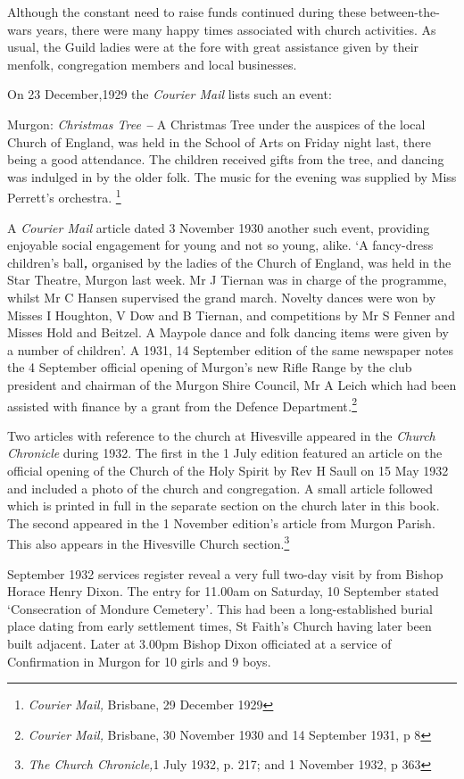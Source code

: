 Although the constant need to raise funds continued during these between-the-wars years, there were many happy times associated with church activities. As usual, the Guild ladies were at the fore with great assistance given by their menfolk, congregation members and local businesses.

On 23 December,1929 the \emph{Courier Mail} lists such an event:

Murgon: \emph{Christmas Tree \textbf{-- }}A Christmas Tree under the auspices of the local Church of England, was held in the School of Arts on Friday night last, there being a good attendance. The children received gifts from the tree, and dancing was indulged in by the older folk. The music for the evening was supplied by Miss Perrett's orchestra. \footnote{\emph{Courier Mail,} Brisbane, 29 December 1929}

A \emph{Courier Mail} article dated 3 November 1930 another such event, providing enjoyable social engagement for young and not so young, alike. `A fancy-dress children's ball\emph{\textbf{,}} organised by the ladies of the Church of England, was held in the Star Theatre, Murgon last week. Mr J Tiernan was in charge of the programme, whilst Mr C Hansen supervised the grand march. Novelty dances were won by Misses I Houghton, V Dow and B Tiernan, and competitions by Mr S Fenner and Misses Hold and Beitzel. A Maypole dance and folk dancing items were given by a number of children'. A 1931, 14 September edition of the same newspaper notes the 4 September official opening of Murgon's new Rifle Range by the club president and chairman of the Murgon Shire Council, Mr A Leich which had been assisted with finance by a grant from the Defence Department\emph{.}\footnote{\emph{Courier Mail,} Brisbane, 30 November 1930 and 14 September 1931, p 8}

Two articles with reference to the church at Hivesville appeared in the \emph{Church Chronicle} during 1932. The first in the 1 July edition featured an article on the official opening of the Church of the Holy Spirit by Rev H Saull on 15 May 1932 and included a photo of the church and congregation. A small article followed which is printed in full in the separate section on the church later in this book. The second appeared in the 1 November edition's article from Murgon Parish. This also appears in the Hivesville Church section.\footnote{\emph{The Church Chronicle,}1 July 1932, p. 217; and 1 November 1932, p 363}

September 1932 services register reveal a very full two-day visit by from Bishop Horace Henry Dixon. The entry for 11.00am on Saturday, 10 September stated `Consecration of Mondure Cemetery'\emph{.} This had been a long-established burial place dating from early settlement times, St Faith's Church having later been built adjacent. Later at 3.00pm Bishop Dixon officiated at a service of Confirmation in Murgon for 10 girls and 9 boys.

